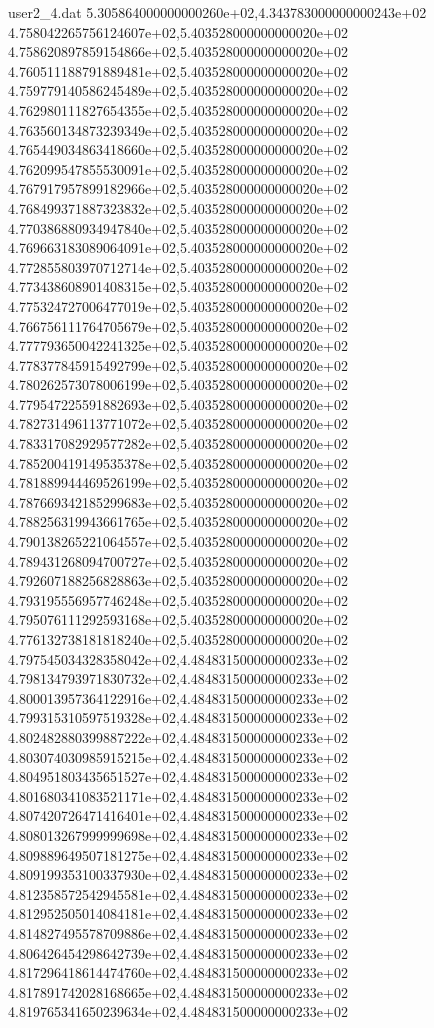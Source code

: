 \begin{filecontents}{user2_4.dat}
5.305864000000000260e+02,4.343783000000000243e+02
4.758042265756124607e+02,5.403528000000000020e+02
4.758620897859154866e+02,5.403528000000000020e+02
4.760511188791889481e+02,5.403528000000000020e+02
4.759779140586245489e+02,5.403528000000000020e+02
4.762980111827654355e+02,5.403528000000000020e+02
4.763560134873239349e+02,5.403528000000000020e+02
4.765449034863418660e+02,5.403528000000000020e+02
4.762099547855530091e+02,5.403528000000000020e+02
4.767917957899182966e+02,5.403528000000000020e+02
4.768499371887323832e+02,5.403528000000000020e+02
4.770386880934947840e+02,5.403528000000000020e+02
4.769663183089064091e+02,5.403528000000000020e+02
4.772855803970712714e+02,5.403528000000000020e+02
4.773438608901408315e+02,5.403528000000000020e+02
4.775324727006477019e+02,5.403528000000000020e+02
4.766756111764705679e+02,5.403528000000000020e+02
4.777793650042241325e+02,5.403528000000000020e+02
4.778377845915492799e+02,5.403528000000000020e+02
4.780262573078006199e+02,5.403528000000000020e+02
4.779547225591882693e+02,5.403528000000000020e+02
4.782731496113771072e+02,5.403528000000000020e+02
4.783317082929577282e+02,5.403528000000000020e+02
4.785200419149535378e+02,5.403528000000000020e+02
4.781889944469526199e+02,5.403528000000000020e+02
4.787669342185299683e+02,5.403528000000000020e+02
4.788256319943661765e+02,5.403528000000000020e+02
4.790138265221064557e+02,5.403528000000000020e+02
4.789431268094700727e+02,5.403528000000000020e+02
4.792607188256828863e+02,5.403528000000000020e+02
4.793195556957746248e+02,5.403528000000000020e+02
4.795076111292593168e+02,5.403528000000000020e+02
4.776132738181818240e+02,5.403528000000000020e+02
4.797545034328358042e+02,4.484831500000000233e+02
4.798134793971830732e+02,4.484831500000000233e+02
4.800013957364122916e+02,4.484831500000000233e+02
4.799315310597519328e+02,4.484831500000000233e+02
4.802482880399887222e+02,4.484831500000000233e+02
4.803074030985915215e+02,4.484831500000000233e+02
4.804951803435651527e+02,4.484831500000000233e+02
4.801680341083521171e+02,4.484831500000000233e+02
4.807420726471416401e+02,4.484831500000000233e+02
4.808013267999999698e+02,4.484831500000000233e+02
4.809889649507181275e+02,4.484831500000000233e+02
4.809199353100337930e+02,4.484831500000000233e+02
4.812358572542945581e+02,4.484831500000000233e+02
4.812952505014084181e+02,4.484831500000000233e+02
4.814827495578709886e+02,4.484831500000000233e+02
4.806426454298642739e+02,4.484831500000000233e+02
4.817296418614474760e+02,4.484831500000000233e+02
4.817891742028168665e+02,4.484831500000000233e+02
4.819765341650239634e+02,4.484831500000000233e+02

\end{filecontents}
